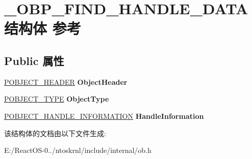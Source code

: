\hypertarget{struct___o_b_p___f_i_n_d___h_a_n_d_l_e___d_a_t_a}{}\section{\+\_\+\+O\+B\+P\+\_\+\+F\+I\+N\+D\+\_\+\+H\+A\+N\+D\+L\+E\+\_\+\+D\+A\+T\+A结构体 参考}
\label{struct___o_b_p___f_i_n_d___h_a_n_d_l_e___d_a_t_a}
\subsection*{Public 属性}
\begin{DoxyCompactItemize}
\item 
\mbox{\label{struct___o_b_p___f_i_n_d___h_a_n_d_l_e___d_a_t_a_ac167b27131c8f228f2e3b67946d66f37}} 
\hyperlink{struct___o_b_j_e_c_t___h_e_a_d_e_r}{P\+O\+B\+J\+E\+C\+T\+\_\+\+H\+E\+A\+D\+ER} {\bfseries Object\+Header}
\item 
\mbox{\label{struct___o_b_p___f_i_n_d___h_a_n_d_l_e___d_a_t_a_a821870becfab0be7c54f719951908dd3}} 
\hyperlink{struct___o_b_j_e_c_t___t_y_p_e}{P\+O\+B\+J\+E\+C\+T\+\_\+\+T\+Y\+PE} {\bfseries Object\+Type}
\item 
\mbox{\label{struct___o_b_p___f_i_n_d___h_a_n_d_l_e___d_a_t_a_a5ec276d5eb81031ab2d388a7ece6a88e}} 
\hyperlink{struct___o_b_j_e_c_t___h_a_n_d_l_e___i_n_f_o_r_m_a_t_i_o_n}{P\+O\+B\+J\+E\+C\+T\+\_\+\+H\+A\+N\+D\+L\+E\+\_\+\+I\+N\+F\+O\+R\+M\+A\+T\+I\+ON} {\bfseries Handle\+Information}
\end{DoxyCompactItemize}


该结构体的文档由以下文件生成\+:\begin{DoxyCompactItemize}
\item 
E\+:/\+React\+O\+S-\/0../ntoskrnl/include/internal/ob.\+h\end{DoxyCompactItemize}
